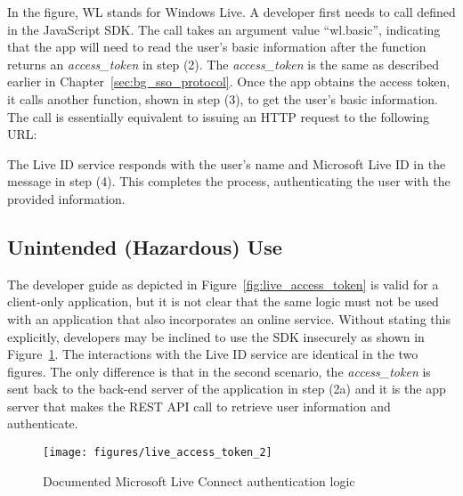 In the figure, WL stands for Windows Live. A developer first needs to call  defined in the JavaScript SDK. The call takes an argument value ``wl.basic'', indicating that the app will need to read the user's basic information after the function returns an \emph{access\_token} in step (2).  The \emph{access\_token} is the same as described earlier in Chapter~\ref{sec:bg_sso_protocol}.  Once the app obtains the access token, it calls another function, shown in step (3), to get the user's basic information.  The call is essentially equivalent to issuing an HTTP request to the following URL:

\setlength{\fboxrule}{0pt}

The Live ID service responds with the user's name and Microsoft Live ID in the message in step (4). This completes the process, authenticating the user with the provided information. 

\subsection{Unintended (Hazardous) Use}

The developer guide as depicted in Figure~\ref{fig:live_access_token} is valid for a client-only application, but it is not clear that the same logic must not be used with an application that also incorporates an online service.  Without stating this explicitly, developers may be inclined to use the SDK insecurely as shown in Figure~\ref{fig:live_access_token_2}. The interactions with the Live ID service are identical in the two figures.  The only difference is that in the second scenario, the \emph{access\_token} is sent back to the back-end server of the application in step (2a) and it is the app server that makes the REST API call to retrieve user information and authenticate. 

\begin{figure}[hbt]
\centering
\texttt{[image: figures/live\_access\_token\_2]}
\caption{Documented Microsoft Live Connect authentication logic}
\label{fig:live_access_token_2}
\end{figure}

